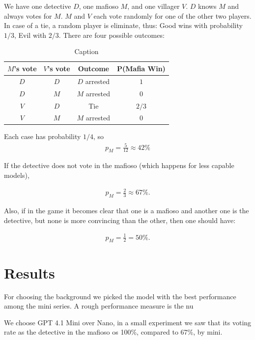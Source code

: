 \documentclass{article}
\begin{document}
We have one detective $D$, one mafioso $M$, and one villager $V$.  
$D$ knows $M$ and always votes for $M$.  
$M$ and $V$ each vote randomly for one of the other two players.  
In case of a tie, a random player is eliminate, thus: Good wins with probability $1/3$, Evil with $2/3$. There are four possible outcomes:
\begin{table}[ht]
    \centering
    \begin{tabular}{|c|c|c|c|}
        \hline
        $M$'s vote & $V$'s vote & Outcome & P(Mafia Win) \\
        \hline
        $D$ & $D$ & $D$ arrested & $1$ \\
        $D$ & $M$ & $M$ arrested & $0$ \\
        $V$ & $D$ & Tie & $2/3$ \\
        $V$ & $M$ & $M$ arrested & $0$ \\
        \hline
    \end{tabular}
    \caption{Caption}
    \label{tab:placeholder}
\end{table}
Each case has probability $1/4$, so
\begin{align}
    p_M=\frac{5}{12}\approx42\%
\end{align}

If the detective does not vote in the mafioso (which happens for less capable models), 

\begin{align}
    p_M=\frac{2}{3}\approx 67\%.
\end{align}

Also, if in the game it becomes clear that one is a mafioso and another one is the detective, but none is more convincing than the other, then one should have:

\begin{align}
    p_M=\frac{1}{2}=50\%.
\end{align}


\section{Results}

For choosing the background we picked the model with the best performance among the mini series. A rough performance measure is the nu

We choose GPT 4.1 Mini over Nano, in a small experiment we saw that its voting rate as the detective in the mafioso os 100\%, compared to 67\%, by mini.
\end{document}
